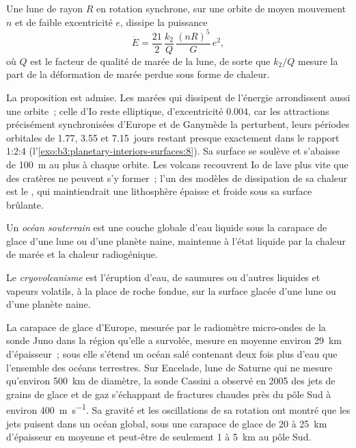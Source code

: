\begin{proposition}\label{prop:b3:planetary-interiors-surfaces:tidal-power}
Une lune de rayon $R$ en rotation synchrone, sur une orbite de moyen mouvement
$n$ et de faible excentricité $e$, dissipe la puissance
\[
  \dot E = \frac{21}{2}\,\frac{k_2}{Q}\,\frac{(nR)^5}{G}\,e^2 ,
\]
où $Q$ est le facteur de qualité de marée de la lune, de sorte que $k_2/Q$ mesure
la part de la déformation de marée perdue sous forme de chaleur.
\end{proposition}

La proposition est admise. Les marées qui dissipent de l'énergie arrondissent aussi
une orbite~; celle d'Io reste elliptique, d'excentricité 0.004, car les
attractions précisément synchronisées d'Europe et de Ganymède la perturbent, leurs
périodes orbitales de 1.77, 3.55 et \num{7.15}~jours restant presque exactement dans le
rapport 1:2:4 (l'\cref{exo:b3:planetary-interiors-surfaces:8}). Sa surface se soulève
et s'abaisse de \qty{100}{m} au plus à chaque orbite. Les volcans
recouvrent Io de lave plus vite que des cratères ne peuvent s'y former~; l'un des modèles de
dissipation de sa chaleur est le , qui maintiendrait une
lithosphère épaisse et froide sous sa surface brûlante.

\begin{definition}\label{def:b3:planetary-interiors-surfaces:ocean-world}
Un \emph{océan souterrain} est une couche globale d'eau
liquide sous la carapace de glace d'une lune ou d'une planète naine, maintenue à l'état
liquide par la chaleur de marée et la chaleur radiogénique.
\end{definition}

\begin{definition}[Cryovolcanisme]\label{def:b3:planetary-interiors-surfaces:cryovolcanism}
Le \emph{cryovolcanisme} est l'éruption d'eau, de saumures
ou d'autres liquides et vapeurs volatils, à la place de roche fondue, sur la
surface glacée d'une lune ou d'une planète naine.
\end{definition}

La carapace de glace d'Europe, mesurée par le radiomètre micro-ondes de la sonde Juno
dans la région qu'elle a survolée, mesure en moyenne environ \qty{29}{km} d'épaisseur~;
sous elle s'étend un océan salé contenant deux fois plus d'eau que l'ensemble des
océans terrestres. Sur Encelade, lune de Saturne qui ne mesure qu'environ \qty{500}{km}
de diamètre, la sonde Cassini a observé en 2005 des jets de grains de glace et de gaz
s'échappant de fractures chaudes près du pôle Sud à environ
\qty{400}{m.s^{-1}}. Sa gravité et les oscillations de sa rotation ont montré
que les jets puisent dans un océan global, sous une carapace de glace de 20 à
\qty{25}{km} d'épaisseur en moyenne et peut-être de seulement 1 à \qty{5}{km} au
pôle Sud.


